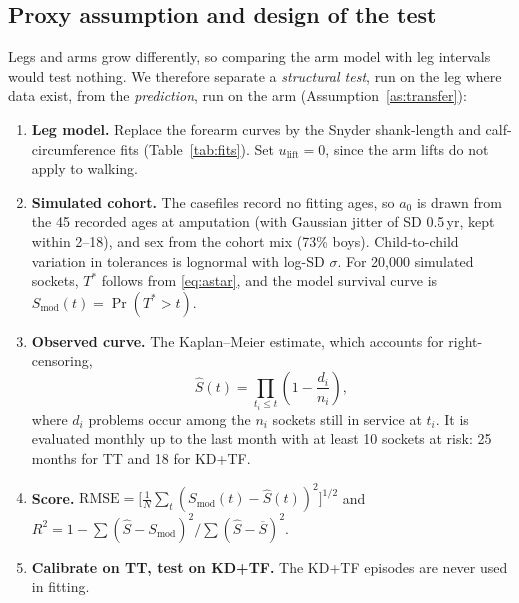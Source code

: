 \documentclass[11pt]{article}
\newcommand{\lift}{u_{\mathrm{lift}}}
\theoremstyle{definition}
\begin{document}
\subsection{Proxy assumption and design of the test}
Legs and arms grow differently, so comparing the arm model with leg intervals would test nothing. We therefore separate a \emph{structural test}, run on the leg where data exist, from the \emph{prediction}, run on the arm (Assumption~\ref{as:transfer}):
\begin{enumerate}[leftmargin=2.2em,itemsep=2pt]
\item \textbf{Leg model.} Replace the forearm curves by the Snyder shank-length and calf-circumference fits (Table~\ref{tab:fits}). Set $\lift=0$, since the arm lifts do not apply to walking.
\item \textbf{Simulated cohort.} The casefiles record no fitting ages, so $a_0$ is drawn from the 45 recorded ages at amputation (with Gaussian jitter of SD 0.5\,yr, kept within 2--18), and sex from the cohort mix (73\% boys). Child-to-child variation in tolerances is lognormal with log-SD $\sigma$. For 20,000 simulated sockets, $T^*$ follows from \eqref{eq:astar}, and the model survival curve is $S_{\mathrm{mod}}(t)=\Pr(T^*>t)$.
\item \textbf{Observed curve.} The Kaplan--Meier estimate, which accounts for right-censoring,
\begin{equation}
\widehat{S}(t)=\prod_{t_i\le t}\!\left(1-\frac{d_i}{n_i}\right),
\label{eq:km}
\end{equation}
where $d_i$ problems occur among the $n_i$ sockets still in service at $t_i$. It is evaluated monthly up to the last month with at least 10 sockets at risk: 25 months for TT and 18 for KD+TF.
\item \textbf{Score.} $\mathrm{RMSE}=\big[\frac1{N}\sum_t(S_{\mathrm{mod}}(t)-\widehat S(t))^2\big]^{1/2}$ and $R^2=1-\sum(\widehat S-S_{\mathrm{mod}})^2/\sum(\widehat S-\overline{S})^2$.
\item \textbf{Calibrate on TT, test on KD+TF.} The KD+TF episodes are never used in fitting.
\end{enumerate}
\end{document}
